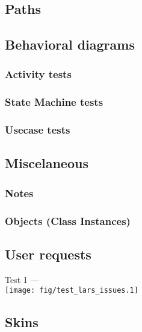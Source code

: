 \subsection{Paths}

\subsection{Behavioral diagrams}
  \subsubsection{Activity tests}

  \subsubsection{State Machine tests}

  \subsubsection{Usecase tests}

\subsection{Miscelaneous}
  \subsubsection{Notes}
  \subsubsection{Objects (Class Instances)}

\subsection{User requests}
  Test 1 --- \\ \texttt{[image: fig/test\_lars\_issues.1]} \\

\subsection{Skins}

